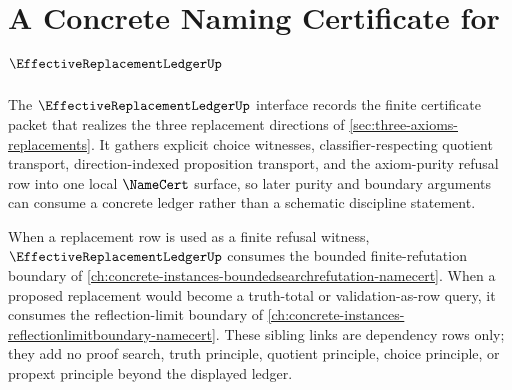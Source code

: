 \chapter{A Concrete Naming Certificate for $\EffectiveReplacementLedgerUp$}
\label{ch:concrete-instances-effective-replacement-ledger-namecert}

The $\EffectiveReplacementLedgerUp$ interface records the finite certificate packet that realizes the three replacement directions of \autoref{sec:three-axioms-replacements}. It gathers explicit choice witnesses, classifier-respecting quotient transport, direction-indexed proposition transport, and the axiom-purity refusal row into one local $\NameCert$ surface, so later purity and boundary arguments can consume a concrete ledger rather than a schematic discipline statement.

When a replacement row is used as a finite refusal witness, $\EffectiveReplacementLedgerUp$ consumes the bounded finite-refutation boundary of \autoref{ch:concrete-instances-boundedsearchrefutation-namecert}. When a proposed replacement would become a truth-total or validation-as-row query, it consumes the reflection-limit boundary of \autoref{ch:concrete-instances-reflectionlimitboundary-namecert}. These sibling links are dependency rows only; they add no proof search, truth principle, quotient principle, choice principle, or propext principle beyond the displayed ledger.

